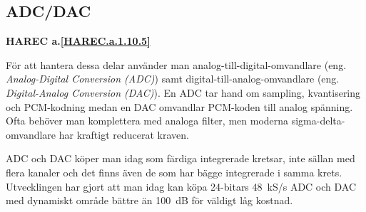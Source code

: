 \subsection{ADC/DAC}
\textbf{HAREC a.\ref{HAREC.a.1.10.5}\label{myHAREC.a.1.10.5}}

För att hantera dessa delar använder man analog-till-digital-omvandlare
(eng. \emph{Analog-Digital Conversion (ADC)}) samt digital-till-analog-omvandlare 
(eng. \emph{Digital-Analog Conversion (DAC)}).
En ADC tar hand om sampling, kvantisering och PCM-kodning medan en DAC
omvandlar PCM-koden till analog spänning.
Ofta behöver man komplettera med analoga filter, men moderna sigma-delta-omvandlare 
har kraftigt reducerat kraven.

ADC och DAC köper man idag som färdiga integrerade kretsar, inte sällan med
flera kanaler och det finns även de som har bägge integrerade i samma krets.
Utvecklingen har gjort att man idag kan köpa 24-bitars 48~kS/s ADC och DAC med
dynamiskt område bättre än 100~dB för väldigt låg kostnad.
